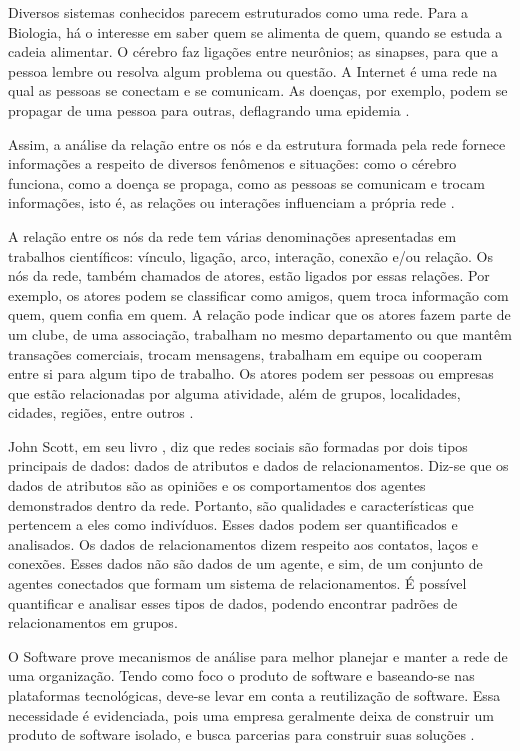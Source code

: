 Diversos sistemas conhecidos parecem estruturados como uma rede. Para a Biologia, há o interesse em saber quem se alimenta de quem, quando se estuda a cadeia alimentar. O cérebro faz ligações entre neurônios; as sinapses, para que a pessoa lembre ou resolva algum problema ou questão. A Internet é uma rede na qual as pessoas se conectam e se comunicam. As doenças, por exemplo, podem se propagar de uma pessoa para outras, deflagrando uma epidemia \cite{Goular:2014}.

Assim, a análise da relação entre os nós e da estrutura formada pela rede fornece informações a respeito de diversos fenômenos e situações: como o cérebro funciona, como a doença se propaga, como as pessoas se comunicam e trocam informações, isto é, as relações ou interações influenciam a própria rede \cite{Goular:2014}.

A relação entre os nós da rede tem várias denominações apresentadas em trabalhos científicos: vínculo, ligação, arco, interação, conexão e/ou relação. Os nós da rede, também chamados de atores, estão ligados por essas relações. Por exemplo, os atores podem se classificar como amigos, quem troca informação com quem, quem confia em quem. A relação pode indicar que os atores fazem parte de um clube, de uma associação, trabalham no mesmo departamento ou que mantêm transações comerciais, trocam mensagens, trabalham em equipe ou cooperam entre si para algum tipo de trabalho. Os atores podem ser pessoas ou empresas que estão relacionadas por alguma atividade, além de grupos, localidades, cidades, regiões, entre outros \cite{Hanneman:Riddle:2005}.

John Scott, em seu livro \cite{Scott:Carrington:2011}, diz que redes sociais são formadas por dois tipos principais de dados: dados de atributos e dados de relacionamentos. Diz-se que os dados de atributos são as opiniões e os comportamentos dos agentes demonstrados dentro da rede. Portanto, são qualidades e características que pertencem a eles como indivíduos. Esses dados podem ser quantificados e analisados. Os dados de relacionamentos dizem respeito aos contatos, laços e conexões. Esses dados não são dados de um agente, e sim, de um conjunto de agentes conectados que formam um sistema de relacionamentos. É possível quantificar e analisar esses tipos de dados, podendo encontrar padrões de relacionamentos em grupos.

O Software prove mecanismos de análise para melhor planejar e manter a rede de uma organização. Tendo como foco o produto de software e baseando-se nas plataformas tecnológicas, deve-se levar em conta a reutilização de software. Essa necessidade é evidenciada, pois uma empresa geralmente deixa de construir um produto de software isolado, e busca parcerias para construir suas soluções \cite{Lima:2015}.

